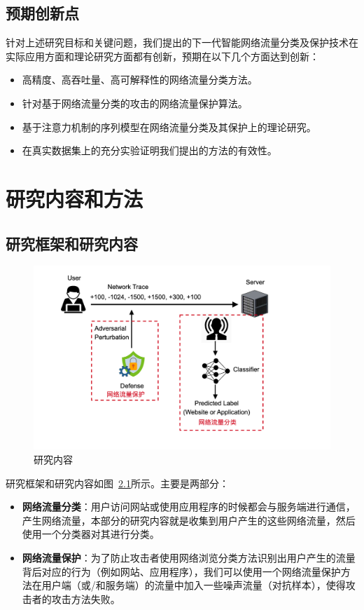\documentclass[degree=master,cjk-font=noto]{thuthesis}
\begin{document}
\section{预期创新点}

针对上述研究目标和关键问题，我们提出的下一代智能网络流量分类及保护技术在实际应用方面和理论研究方面都有创新，预期在以下几个方面达到创新：

\begin{itemize}
	\item 高精度、高吞吐量、高可解释性的网络流量分类方法。
	\item 针对基于网络流量分类的攻击的网络流量保护算法。
	\item 基于注意力机制的序列模型在网络流量分类及其保护上的理论研究。
	\item 在真实数据集上的充分实验证明我们提出的方法的有效性。
\end{itemize}


\chapter{研究内容和方法}

\section{研究框架和研究内容}

\begin{figure}[!htp]
	\centerline{\includegraphics[width=15cm]{framework.png}}
	\caption{研究内容}
	\label{framework}
\end{figure}

研究框架和研究内容如图~\ref{framework}所示。主要是两部分：

\begin{itemize}
	\item \textbf{网络流量分类}：用户访问网站或使用应用程序的时候都会与服务端进行通信，产生网络流量，本部分的研究内容就是收集到用户产生的这些网络流量，然后使用一个分类器对其进行分类。
	\item \textbf{网络流量保护}：为了防止攻击者使用网络浏览分类方法识别出用户产生的流量背后对应的行为（例如网站、应用程序），我们可以使用一个网络流量保护方法在用户端（或/和服务端）的流量中加入一些噪声流量（对抗样本），使得攻击者的攻击方法失败。
\end{itemize}
\end{document}
